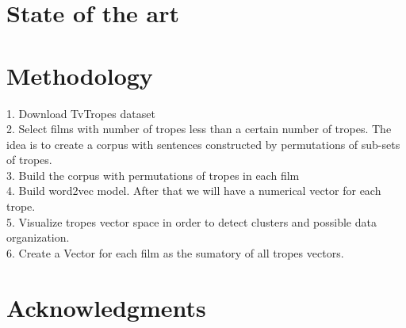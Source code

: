 \documentclass[letterpaper]{article}
\begin{document}



\section{State of the art}

\section{Methodology}

1. Download TvTropes dataset \\
2. Select films with number of tropes less than a certain number of tropes. The idea is to create a corpus with sentences constructed by permutations of sub-sets of tropes. \\
3. Build the corpus with permutations of tropes in each film \\
4. Build word2vec model. After that we will have a numerical vector for each trope. \\
5. Visualize tropes vector space in order to detect clusters and possible data organization. \\ 
6. Create a Vector for each film as the sumatory of all tropes vectors. \\

 


\section{Acknowledgments}




\end{document}
